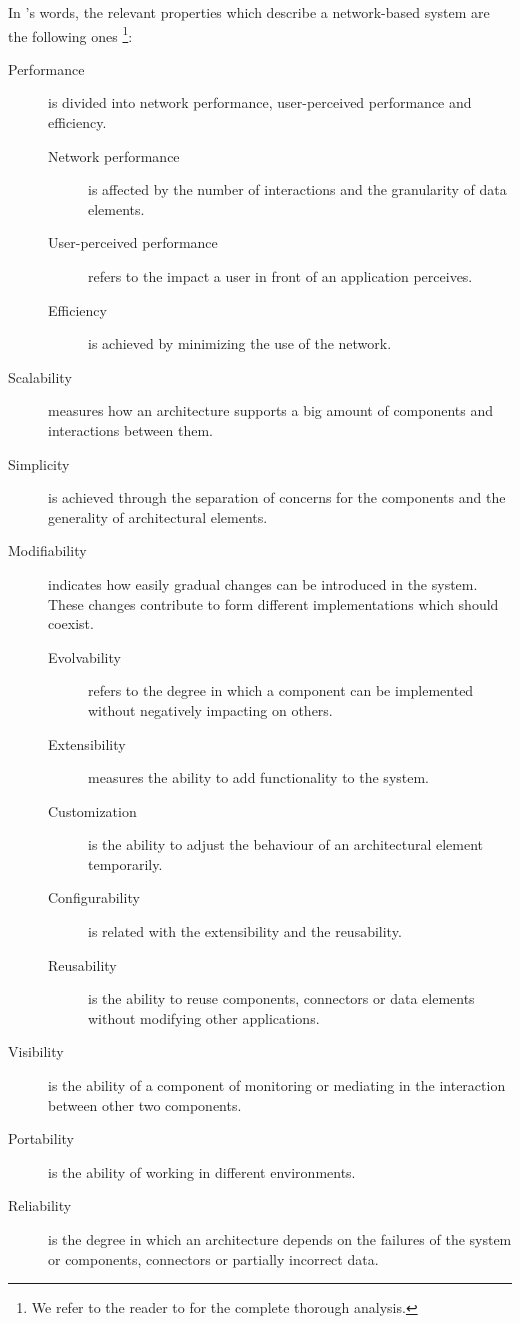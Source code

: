 In \citeauthor{fielding_architectural_2000}'s words, the relevant properties which describe a network-based system are the following ones \footnote{We refer to the reader to \citet{fielding_architectural_2000} for the complete thorough analysis.}:
\begin{description}
  \item[Performance] is divided into network performance, user-perceived performance and efficiency.
    \begin{description}
      \item[Network performance] is affected by the number of interactions and the granularity of data elements.
      \item[User-perceived performance] refers to the impact a user in front of an application perceives. %
      \item[Efficiency] is achieved by minimizing the use of the network.
    \end{description}
  \item[Scalability] measures how an architecture supports a big amount of components and interactions between them.
  \item[Simplicity] is achieved through the separation of concerns for the components and the generality of architectural elements.
  \item[Modifiability] indicates how easily gradual changes can be introduced in the system.
                       These changes contribute to form different implementations which should coexist.
    \begin{description}
      \item[Evolvability] refers to the degree in which a component can be implemented without negatively impacting on others.
      \item[Extensibility] measures the ability to add functionality to the system.
      \item[Customization] is the ability to adjust the behaviour of an architectural element temporarily.
      \item[Configurability] is related with the extensibility and the reusability.
      \item[Reusability] is the ability to reuse components, connectors or data elements without modifying other applications.
    \end{description}
  \item[Visibility] is the ability of a component of monitoring or mediating in the interaction between other two components.
  \item[Portability] is the ability of working in different environments.
  \item[Reliability] is the degree in which an architecture depends on the failures of the system or components, connectors or partially incorrect data.
\end{description}

